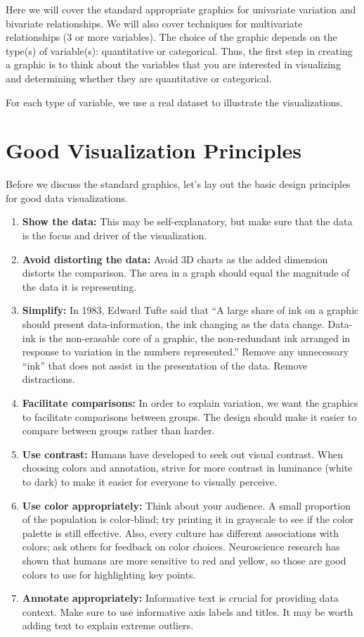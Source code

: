 \documentclass[
]{book}
\begin{document}
Here we will cover the standard appropriate graphics for univariate variation and bivariate relationships. We will also cover techniques for multivariate relationships (3 or more variables). The choice of the graphic depends on the type(s) of variable(s): quantitative or categorical. Thus, the first step in creating a graphic is to think about the variables that you are interested in visualizing and determining whether they are quantitative or categorical.

For each type of variable, we use a real dataset to illustrate the visualizations.

\hypertarget{good-visualization-principles}{%
\section{Good Visualization Principles}\label{good-visualization-principles}}

Before we discuss the standard graphics, let's lay out the basic design principles for good data visualizations.

\begin{enumerate}
\def\labelenumi{\arabic{enumi}.}
\item
  \textbf{Show the data:} This may be self-explanatory, but make sure that the data is the focus and driver of the visualization.
\item
  \textbf{Avoid distorting the data:} Avoid 3D charts as the added dimension distorts the comparison. The area in a graph should equal the magnitude of the data it is representing.
\item
  \textbf{Simplify:} In 1983, Edward Tufte said that ``A large share of ink on a graphic should present data-information, the ink changing as the data change. Data-ink is the non-erasable core of a graphic, the non-redundant ink arranged in response to variation in the numbers represented.'' Remove any unnecessary ``ink'' that does not assist in the presentation of the data. Remove distractions.
\item
  \textbf{Facilitate comparisons:} In order to explain variation, we want the graphics to facilitate comparisons between groups. The design should make it easier to compare between groups rather than harder.
\item
  \textbf{Use contrast:} Humans have developed to seek out visual contrast. When choosing colors and annotation, strive for more contrast in luminance (white to dark) to make it easier for everyone to visually perceive.
\item
  \textbf{Use color appropriately:} Think about your audience. A small proportion of the population is color-blind; try printing it in grayscale to see if the color palette is still effective. Also, every culture has different associations with colors; ask others for feedback on color choices. Neuroscience research has shown that humans are more sensitive to red and yellow, so those are good colors to use for highlighting key points.
\item
  \textbf{Annotate appropriately:} Informative text is crucial for providing data context. Make sure to use informative axis labels and titles. It may be worth adding text to explain extreme outliers.
\end{enumerate}
\end{document}
